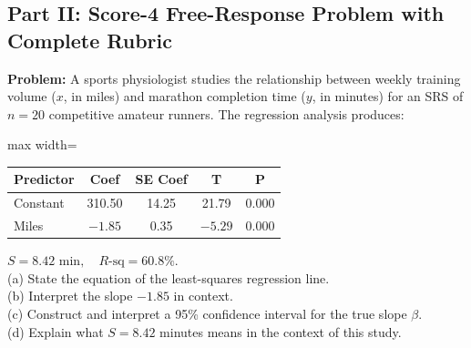 \subsection*{Part II: Score-4 Free-Response Problem with Complete Rubric}

\begin{frqrubricbox}
\textbf{Problem:} A sports physiologist studies the relationship between weekly training volume ($x$, in miles) and marathon completion time ($y$, in minutes) for an SRS of $n = 20$ competitive amateur runners. The regression analysis produces:
\begin{center}
\begin{adjustbox}{max width=\linewidth}
\begin{tabular}{lcccc}
\toprule
\textbf{Predictor} & \textbf{Coef} & \textbf{SE Coef} & \textbf{T} & \textbf{P} \\
\midrule
Constant & 310.50 & 14.25 & 21.79 & 0.000 \\
Miles & $-1.85$ & 0.35 & $-5.29$ & 0.000 \\
\bottomrule
\end{tabular}
\end{adjustbox}
\end{center}
$S = 8.42\text{ min}, \quad R\text{-sq} = 60.8\%$.\\
(a) State the equation of the least-squares regression line.\\
(b) Interpret the slope $-1.85$ in context.\\
(c) Construct and interpret a 95\% confidence interval for the true slope $\beta$.\\
(d) Explain what $S = 8.42$ minutes means in the context of this study.


\end{frqrubricbox}
